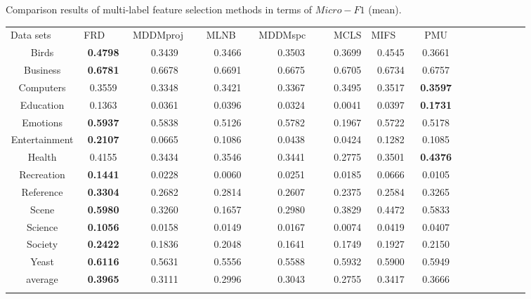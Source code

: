 \documentclass[final,3p,times]{elsarticle}
\begin{document}
\begin{table5-6*}
\begin{center}
\caption{Comparison results of multi-label feature selection methods in terms of $Micro-F1$ (mean).}
\label{tab:1}
\begin{tabular}{ccccccccccccccc}
\hline\noalign{\smallskip}
Data sets    ~~~~& FRD ~~~& MDDMproj ~~& MLNB  ~~& MDDMspc ~~~& MCLS & MIFS~~~& PMU \\
\noalign{\smallskip}\hline\noalign{\smallskip}
Birds &	\textbf{0.4798}  &  0.3439   & 0.3466  &  0.3503  &  0.3699  &  0.4545  &  0.3661  \\

Business &	\textbf{0.6781}  &  0.6678  &  0.6691  &  0.6675   & 0.6705  &  0.6734  &  0.6757  \\

Computers &	0.3559  &  0.3348  &  0.3421  &  0.3367  &  0.3495  &  0.3517  &  \textbf{0.3597}  \\

Education & 0.1363  &  0.0361 &   0.0396   & 0.0324  &  0.0041  &  0.0397  &  \textbf{0.1731}   \\

Emotions &	\textbf{0.5937}  &  0.5838  &  0.5126   & 0.5782  &  0.1967  &  0.5722  &  0.5178  \\

Entertainment  & \textbf{0.2107}  &  0.0665  &  0.1086  &  0.0438  &  0.0424  &  0.1282  &  0.1085   \\

Health  &	0.4155  &  0.3434  &  0.3546  &  0.3441  &  0.2775  &  0.3501  &  \textbf{0.4376}  \\

Recreation &  \textbf{0.1441}  &  0.0228  &  0.0060  &  0.0251  &  0.0185  & 0.0666  &  0.0105  \\

Reference &	\textbf{0.3304}  &  0.2682  &  0.2814  &  0.2607  &  0.2375  &  0.2584 &   0.3265  \\

Scene &	\textbf{0.5980}  &	  0.3260  &	  0.1657 &	   0.2980  & 0.3829  &	  0.4472  &	  0.5833   \\

Science &	\textbf{0.1056}  &  0.0158  &  0.0149  &  0.0167  &  0.0074  &  0.0419  &  0.0407   \\

Society &	\textbf{0.2422}  &  0.1836  &  0.2048  &  0.1641 &   0.1749  &  0.1927  &  0.2150  \\

Yeast &	\textbf{0.6116}  &  0.5631  &  0.5556  &  0.5588  &  0.5932  &  0.5900  &  0.5949   \\

average &  \textbf{0.3965}  &  0.3111  &  0.2996  &  0.3043  &  0.2755  &  0.3417  &  0.3666   \\
\noalign{\smallskip}\hline
\end{tabular}
\end{center}
\end{table5-6*}
\end{document}
